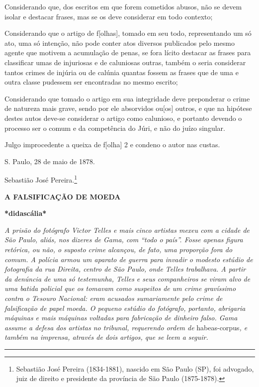 Considerando que, dos escritos em que forem cometidos abusos, não se
devem isolar e destacar frases, mas se os deve considerar em todo
contexto;

Considerando que o artigo de f{[}olhas{]}, tomado em seu todo,
representando um só ato, uma só intenção, não pode conter atos diversos
publicados pelo mesmo agente que motivem a acumulação de penas, se fora
lícito destacar as frases para classificar umas de injuriosas e de
caluniosas outras, também o seria considerar tantos crimes de injúria ou
de calúnia quantas fossem as frases que de uma e outra classe pudessem
ser encontradas no mesmo escrito;

Considerando que tomado o artigo em sua integridade deve preponderar o
crime de natureza mais grave, sendo por ele absorvidos ou{[}os{]}
outros, e que na hipótese destes autos deve-se considerar o artigo como
calunioso, e portanto devendo o processo ser o comum e da competência do
Júri, e não do juízo singular.

Julgo improcedente a queixa de f{[}olha{]} 2 e condeno o autor nas
custas.

S. Paulo, 28 de maio de 1878.

Sebastião José Pereira.\footnote{Sebastião José Pereira (1834-1881),
  nascido em São Paulo (SP), foi advogado, juiz de direito e presidente
  da província de São Paulo (1875-1878).}

\textbf{A FALSIFICAÇÃO DE MOEDA}

\textbf{*didascália*}

\emph{A prisão do fotógrafo Victor Telles e mais cinco artistas mexeu
com a cidade de São Paulo, aliás, nos dizeres de Gama, com ``todo o
país''. Fosse apenas figura retórica, ou não, o suposto crime alcançou,
de fato, uma proporção fora do comum. A polícia armou um aparato de
guerra para invadir o modesto estúdio de fotografia da rua Direita,
centro de São Paulo, onde Telles trabalhava. A partir da denúncia de uma
só testemunha, Telles e seus companheiros se viram alvo de uma batida
policial que os tomavam como suspeitos de um crime gravíssimo contra o
Tesouro Nacional: eram acusados sumariamente pelo crime de falsificação
de papel moeda. O pequeno estúdio do fotógrafo, portanto, abrigaria
máquinas e mais máquinas voltadas para fabricação de dinheiro falso.
Gama assume a defesa dos artistas no tribunal, requerendo ordem de}
habeas-corpus\emph{, e também na imprensa, através de dois artigos, que
se leem a seguir. }

\begin{center}\rule{0.5\linewidth}{\linethickness}\end{center}

